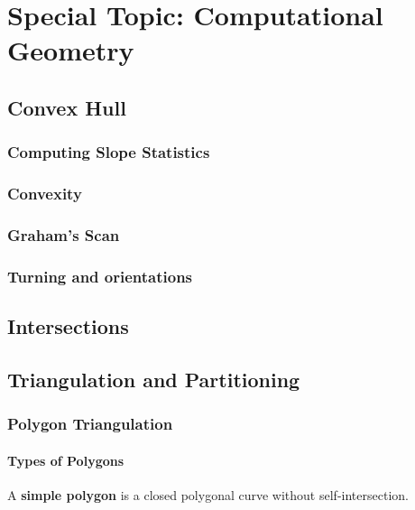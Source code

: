 

\part*{Special Topic: Computational Geometry}
	\chapter{Convex Hull}
		\section{Computing Slope Statistics}

		\section{Convexity}

		\section{Graham's Scan}

		\section{Turning and orientations}
	\chapter{Intersections}

	\chapter{Triangulation and Partitioning}
		\section{Polygon Triangulation}
			\subsection{Types of Polygons}
				\begin{definition}
					A \textbf{simple polygon} is a closed polygonal curve without self-intersection.
				\end{definition}

				\begin{figure}[h!]
					\centering
				\end{figure}

